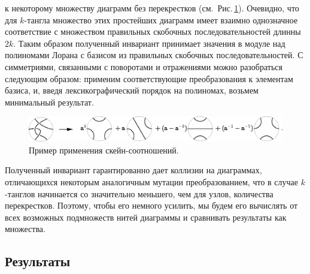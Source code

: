 \documentclass[12pt]{article}
\theoremstyle{plain}
\theoremstyle{definition}
\def\figureref#1{Рис.\,\protect\ref{#1}}
\begin{document}
		к некоторому множеству диаграмм без перекрестков (см.~\figureref{figure:jones-example}). Очевидно, что для $k$-тангла множество этих
		простейших диаграмм имеет взаимно однозначное соответствие с множеством правильных скобочных последовательностей длинны $2 k$. Таким
		образом полученный инвариант принимает значения в модуле над полиномами Лорана с базисом из правильных скобочных последовательностей.
		С симметриями, связанными с поворотами и отражениями можно разобраться следующим образом: применим соответствующие преобразования к
		элементам базиса, и, введя лексикографический порядок на полиномах, возьмем минимальный результат.

		\begin{figure}[ht]
			\centering
			\includegraphics[scale=0.7]{c/tangle-kauffman-example.eps}
			\caption{\footnotesize Пример применения скейн-соотношений.\label{figure:jones-example}}
		\end{figure}

		Полученный инвариант гарантированно дает коллизии на диаграммах, отличающихся некоторым аналогичным мутации преобразованием, что в
		случае $k$-танглов начинается со значительно меньшего, чем для узлов, количества перекрестков. Поэтому, чтобы его немного усилить,
		мы будем его вычислять от всех возможных подмножеств нитей диаграммы и сравнивать результаты как множества.

	\subsection{Результаты}
\end{document}
